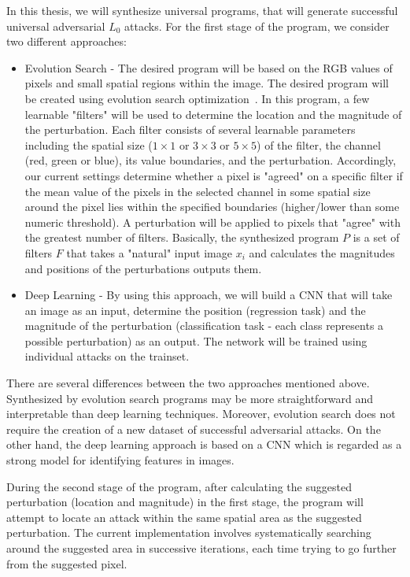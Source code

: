 \documentclass[11pt]{article}
\begin{document}
In this thesis, we will synthesize universal programs, that will generate successful universal adversarial $L_0$ attacks. For the first stage of the program, we consider two different approaches:
\begin{itemize}
    \item Evolution Search - The desired program will be based on the RGB values of pixels and small spatial regions within the image. The desired program will be created using evolution search optimization~\cite{GOLDBERG199169, real2019regularized}. In this program, a few learnable "filters" will be used to determine the location and the magnitude of the perturbation. Each filter consists of several learnable parameters including the spatial size ($1\times1$ or $3\times3$ or $5\times5$) of the filter, the channel (red, green or blue), its value boundaries, and the perturbation. Accordingly, our current settings determine whether a pixel is "agreed" on a specific filter if the mean value of the pixels in the selected channel in some spatial size around the pixel lies within the specified boundaries (higher/lower than some numeric threshold). A perturbation will be applied to pixels that "agree" with the greatest number of filters. Basically, the synthesized program $P$ is a set of filters $F$ that takes a "natural" input image $x_i$ and calculates the magnitudes and positions of the perturbations outputs them. 
    \item Deep Learning - By using this approach, we will build a CNN that will take an image as an input, determine the position (regression task) and the magnitude of the perturbation (classification task - each class represents a possible perturbation) as an output. The network will be trained using individual attacks on the trainset. 
\end{itemize}
There are several differences between the two approaches mentioned above. Synthesized by evolution search programs may be more straightforward and interpretable than deep learning techniques. Moreover, evolution search does not require the creation of a new dataset of successful adversarial attacks. On the other hand, the deep learning approach is based on a CNN which is regarded as a strong model for identifying features in images.

During the second stage of the program, after calculating the suggested perturbation (location and magnitude) in the first stage, the program will attempt to locate an attack within the same spatial area as the suggested perturbation. The current implementation involves systematically searching around the suggested area in successive iterations, each time trying to go further from the suggested pixel.
\end{document}
